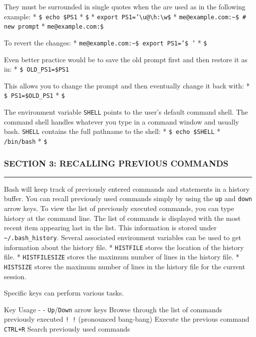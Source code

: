 They must be surrounded in single quotes when the are used as in the
following example: * \texttt{\$ echo \$PS1} * \texttt{\$} *
\texttt{export PS1='\textbackslash{}u@\textbackslash{}h:\textbackslash{}w\$}
* \texttt{me@example.com:\textasciitilde{}\$ \# new prompt} *
\texttt{me@example.com:\$}

To revert the changes: *
\texttt{me@example.com:\textasciitilde{}\$ export PS1='\$ '} *
\texttt{\$}

Even better practice would be to save the old prompt first and then
restore it as in: * \texttt{\$ OLD\_PS1=\$PS1}

This allows you to change the prompt and then eventually change it back
with: * \texttt{\$ PS1=\$OLD\_PS1} * \texttt{\$}

The environment variable \texttt{SHELL} points to the user's default
command shell. The command shell handles whatever you type in a command
window and usually bash. \texttt{SHELL} contains the full pathname to
the shell: * \texttt{\$ echo \$SHELL} * \texttt{/bin/bash} * \texttt{\$}

\subsubsection{SECTION 3: RECALLING PREVIOUS
COMMANDS}\label{section-3-recalling-previous-commands}

\begin{center}\rule{3in}{0.4pt}\end{center}

Bash will keep track of previously entered commands and statements in a
history buffer. You can recall previously used commands simply by using
the \texttt{up} and \texttt{down} arrow keys. To view the list of
previously executed commands, you can type history at the command line.
The list of commands is displayed with the most recent item appearing
last in the list. This information is stored under
\texttt{\textasciitilde{}/.bash\_history}. Several associated
environment variables can be used to get information about the history
file. * \texttt{HISTFILE} stores the location of the history file. *
\texttt{HISTFILESIZE} stores the maximum number of lines in the history
file. * \texttt{HISTSIZE} stores the maximum number of lines in the
history file for the current session.

Specific keys can perform various tasks.

Key \textbar{} Usage - \textbar{} - \texttt{Up}/\texttt{Down} arrow keys
\textbar{} Browse through the list of commands previously executed
\texttt{! !} (pronounced bang-bang) \textbar{} Execute the previous
command \texttt{CTRL+R} \textbar{} Search previously used commands

